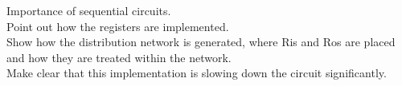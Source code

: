 
Importance of sequential circuits.\\
Point out how the registers are implemented.\\
Show how the distribution network is generated, where Ris and Ros are placed and how they are treated within the network.\\
Make clear that this implementation is slowing down the circuit significantly.